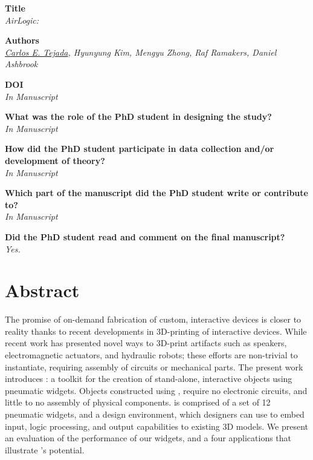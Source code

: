   \vfill

  \noindent
  \textbf{Title}\\
  \textit{AirLogic: }

  \bigskip

  \noindent
  \textbf{Authors}\\
  \textit{\underline{Carlos E. Tejada}, Hyunyung Kim, Mengyu Zhong, Raf Ramakers, Daniel Ashbrook}

  \bigskip

  \noindent
  \textbf{DOI}\\
  \textit{In Manuscript}

  \bigskip

  \noindent
  \textbf{What was the role of the PhD student in designing the study?}\\
  \textit{In Manuscript}

  \bigskip

  \noindent
  \textbf{How did the PhD student participate in data collection and/or development of theory?}\\
  \textit{In Manuscript}

  \bigskip

  \noindent
  \textbf{Which part of the manuscript did the PhD student write or contribute to?}\\
  \textit{In Manuscript}

  \bigskip

  \noindent
  \textbf{Did the PhD student read and comment on the final manuscript?}\\
  \textit{Yes.}

  \bigskip
  \vfill

  \newpage

  \section{Abstract}
    The promise of on-demand fabrication of custom, interactive devices is
    closer to reality thanks to recent developments in 3D-printing of
    interactive devices. While recent work has presented novel ways to
    3D-print artifacts such as speakers, electromagnetic actuators, and
    hydraulic robots; these efforts are non-trivial to instantiate,
    requiring assembly of circuits or mechanical parts. The present work
    introduces \al: a toolkit for the creation of stand-alone, interactive
    objects using pneumatic widgets. Objects constructed using \al, require
    no electronic circuits, and little to no assembly of physical
    components. \al is comprised of a set of 12 pneumatic widgets, and a
    design environment, which designers can use to embed input, logic
    processing, and output capabilities to existing 3D models. We present
    an evaluation of the performance of our widgets, and a four
    applications that illustrate \al's potential.

